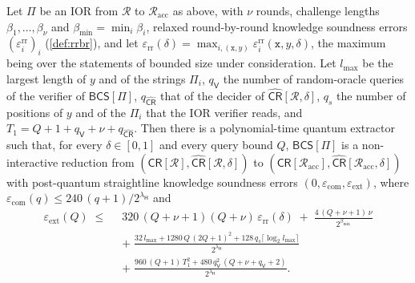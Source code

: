 \begin{theorem}\label{thm:cdhz}
Let $\Pi$ be an IOR from $\mathcal{R}$ to $\mathcal{R}_{\mathrm{acc}}$ as above, with $\nu$ rounds, challenge lengths $\beta_1,\dots,\beta_\nu$ and $\beta_{\min} = \min_i \beta_i$, relaxed round-by-round knowledge soundness errors $(\varepsilon^{\mathrm{rr}}_i)_i$ (\cref{def:rrbr}), and let $\varepsilon_{\mathrm{rr}}(\delta) = \max_{i, (\mathtt{x}, y)} \varepsilon^{\mathrm{rr}}_i(\mathtt{x}, y, \delta)$, the maximum being over the statements of bounded size under consideration.
Let $l_{\max}$ be the largest length of $y$ and of the strings $\Pi_i$, $q_{\mathsf{V}}$ the number of random-oracle queries of the verifier of $\mathsf{BCS}[\Pi]$, $q_{\widehat{\mathsf{CR}}}$ that of the decider of $\widehat{\mathsf{CR}}[\mathcal{R},\delta]$, $q_s$ the number of positions of $y$ and of the $\Pi_i$ that the IOR verifier reads, and $T_1 = Q + 1 + q_{\mathsf{V}} + \nu + q_{\widehat{\mathsf{CR}}}$.
Then there is a polynomial-time quantum extractor such that, for every $\delta \in [0,1]$ and every query bound $Q$, $\mathsf{BCS}[\Pi]$ is a non-interactive reduction from $(\mathsf{CR}[\mathcal{R}], \widehat{\mathsf{CR}}[\mathcal{R}, \delta])$ to $(\mathsf{CR}[\mathcal{R}_{\mathrm{acc}}], \widehat{\mathsf{CR}}[\mathcal{R}_{\mathrm{acc}}, \delta])$ with post-quantum straightline knowledge soundness errors $(0, \varepsilon_{\mathrm{com}}, \varepsilon_{\mathrm{ext}})$, where $\varepsilon_{\mathrm{com}}(q) \le 240\,(q+1)/2^{\lambda_{\mathsf{H}}}$ and
\begin{align*}
  \varepsilon_{\mathrm{ext}}(Q) \;\le\;\;& 320\,(Q+\nu+1)(Q+\nu)\,\varepsilon_{\mathrm{rr}}(\delta) \;+\; \frac{4\,(Q+\nu+1)\,\nu}{2^{\beta_{\min}}} \\
  &+\; \frac{32\, l_{\max} + 1280\, Q\,(2Q+1)^2 + 128\, q_s \lceil \log_2 l_{\max} \rceil}{2^{\lambda_{\mathsf{H}}}} \\
  &+\; \frac{960\,(Q+1)\,T_1^2 + 480\, q_{\mathsf{V}}^2\,(Q + \nu + q_{\mathsf{V}} + 2)}{2^{\lambda_{\mathsf{H}}}}.
\end{align*}
\end{theorem}

